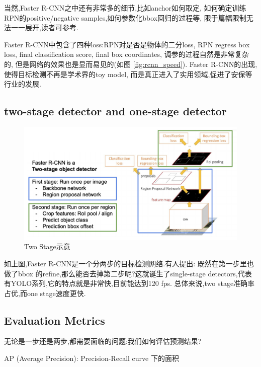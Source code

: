 当然,Faster R-CNN之中还有非常多的细节,比如anchor如何取定,
如何确定训练RPN的positive/negative samples,如何参数化bbox回归的过程等,
限于篇幅限制无法一一展开,读者可参考\cite{FasterRCNN}.

Faster R-CNN中包含了四种loss:RPN对是否是物体的二分loss,
RPN regress box loss, final classification score, 
final box coordinates, 调参的过程自然是非常复杂的,
但是网络的效果也是显而易见的(如图 \ref{fig:rcnn_speed}).
Faster R-CNN的出现,使得目标检测不再是学术界的toy model, 
而是真正进入了实用领域,促进了安保等行业的发展.

\subsection{two-stage detector and one-stage detector}

\begin{figure}[htbp]
    \centering
    \includegraphics[scale=0.45]{figures/two_stage_detector.png}
    \caption{Two Stage示意}
\end{figure}

如上图,Faster R-CNN是一个分两步的目标检测网络.有人提出:
既然在第一步里也做了bbox 的refine,那么能否去掉第二步呢?这就诞生了single-stage 
detectors,代表有YOLO系列,它的特点就是非常快,目前能达到120 fps.
总体来说,two stage准确率占优,而one stage速度更快.

\subsection{Evaluation Metrics}

无论是一步还是两步,都需要面临的问题:我们如何评估预测结果?


AP (Average Precision): Precision-Recall curve 下的面积

